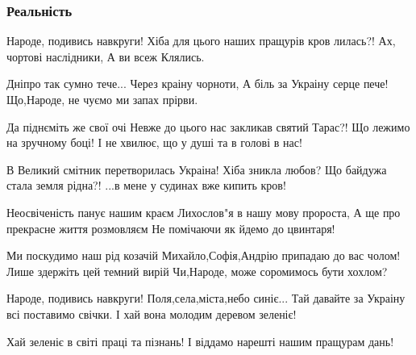  
 
 

\subsubsection{Реальність}

Народе, подивись навкруги!
Хіба для цього наших пращурів кров лилась?!
Ах, чортові наслідники,
А ви всеж Клялись.

Дніпро так сумно тече...
Через краіну чорноти,
А біль за Украіну серце пече!
Що,Народе, не чуємо ми запах прірви.

Да піднєміть же свої очі
Невже до цього нас закликав святий Тарас?!
Що лежимо на зручному боці!
І не хвилює, що у душі та в голові в нас!

В Великий смітник перетворилась Украіна!
Хіба зникла любов?
Що байдужа стала земля рідна?!
...в мене у судинах вже кипить кров!

Неосвіченість панує нашим краєм
Лихослов"я в нашу мову пророста,
А ще про прекрасне життя розмовляєм
Не помічаючи як йдемо до цвинтаря!

Ми поскудимо наш рід козачій
Михайло,Софія,Андрію припадаю до вас чолом!
Лише здержіть цей темний вирій
Чи,Народе, може соромимось бути хохлом?

Народе, подивись навкруги!
Поля,села,міста,небо синіє...
Тай давайте за Украіну всі поставимо свічки.
І хай вона молодим деревом зеленіє!

Хай зеленіє в світі праці та пізнань!
І віддамо нарешті нашим пращурам дань!
